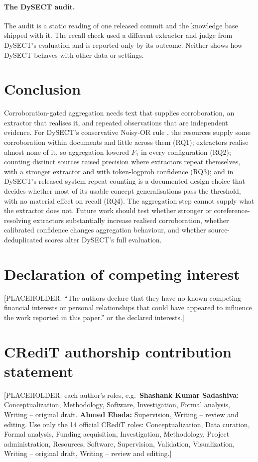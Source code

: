 \documentclass[preprint,12pt,authoryear]{elsarticle}
\begin{document}
\paragraph{The DySECT audit.} The audit is a static reading of one
released commit and the knowledge base shipped with it. The recall check
used a different extractor and judge from DySECT's evaluation and is
reported only by its outcome. Neither shows how DySECT behaves with other
data or settings.

\section{Conclusion}
\label{sec:conclusion}

Corroboration-gated aggregation needs text that supplies corroboration,
an extractor that realises it, and repeated observations that are
independent evidence. For DySECT's conservative Noisy-OR rule
\citep{aminnaseri2026dysect}, the resources supply some corroboration
within documents and little across them (RQ1); extractors realise almost
none of it, so aggregation lowered $F_1$ in every configuration (RQ2);
counting distinct sources raised precision where extractors repeat
themselves, with a stronger extractor and with token-logprob confidence
(RQ3); and in DySECT's released system repeat counting is a documented
design choice that decides whether most of its usable concept
generalisations pass the threshold, with no material effect on recall
(RQ4). The aggregation step cannot supply what the extractor does not.
Future work should test whether stronger or coreference-resolving
extractors substantially increase realised corroboration, whether
calibrated confidence changes aggregation behaviour, and whether
source-deduplicated scores alter DySECT's full evaluation.

\section*{Declaration of competing interest}
[PLACEHOLDER: ``The authors declare that they have no known competing
financial interests or personal relationships that could have appeared
to influence the work reported in this paper.'' or the declared
interests.]

\section*{CRediT authorship contribution statement}
[PLACEHOLDER: each author's roles, e.g.\ \textbf{Shashank Kumar
Sadashiva:} Conceptualization, Methodology, Software, Investigation,
Formal analysis, Writing -- original draft. \textbf{Ahmed Ebada:}
Supervision, Writing -- review and editing. Use only the 14 official
CRediT roles: Conceptualization, Data curation, Formal analysis, Funding
acquisition, Investigation, Methodology, Project administration,
Resources, Software, Supervision, Validation, Visualization, Writing --
original draft, Writing -- review and editing.]
\end{document}
